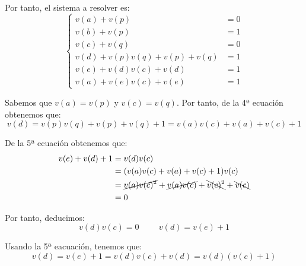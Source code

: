 \begin{ejercicio}
    Por tanto, el sistema a resolver es:
    \begin{equation*}
        \left\{
            \begin{aligned}
                v(a) + v(p) &= 0\\
                v(b) + v(p) &= 1\\
                v(c) + v(q) &= 0\\
                v(d) + v(p)v(q) + v(p) + v(q) &= 1\\
                v(e) + v(d)v(c) + v(d) &= 1\\
                v(a) + v(e)v(c) + v(e) &= 1
            \end{aligned}
        \right.
    \end{equation*}

    Sabemos que $v(a)=v(p)$ y $v(c)=v(q)$. Por tanto, de la 4ª ecuación obtenemos que:
    \begin{equation*}
        v(d) = v(p)v(q) + v(p) + v(q) +1 = v(a)v(c) + v(a) + v(c) + 1
    \end{equation*}

    De la 5ª ecuación obtenemos que:
    \begin{align*}
        v(e) + v(d) + 1 &= v(d)v(c)\\
        &= (v(a)v(c) + v(a) + v(c) + 1)v(c)\\
        &= \cancel{v(a)v(c)^2} + \cancel{v(a)v(c)} + \bcancel{v(c)^2} + \bcancel{v(c)}\\
        &= 0
    \end{align*}
    
    Por tanto, deducimos:
    \begin{equation*}
        v(d)v(c)=0\hspace{1cm} v(d) = v(e)+1
    \end{equation*}

    Usando la 5ª eacuación, tenemos que:
    \begin{equation*}
        v(d) = v(e) + 1 = v(d)v(c) + v(d) = v(d)(v(c)+1)
    \end{equation*}


\end{ejercicio}
